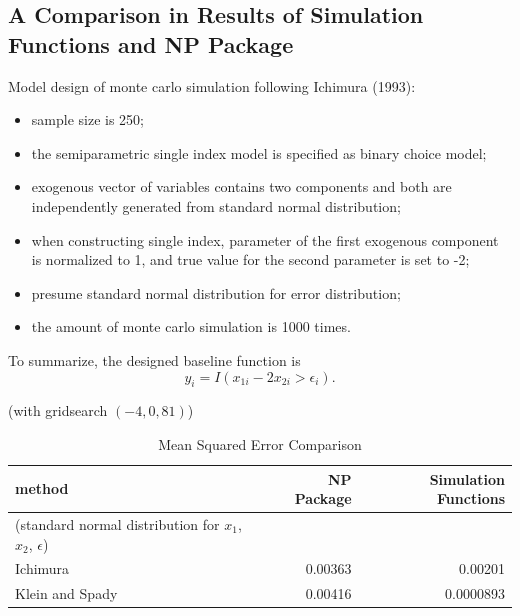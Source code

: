 \documentclass[a4paper]{article}
\begin{document}
\subsection{A Comparison in Results of Simulation Functions and NP Package}
Model design of monte carlo simulation following Ichimura (1993):
\begin{itemize}
\item sample size is 250;
\item the semiparametric single index model is specified as binary choice model;
\item exogenous vector of variables contains two components and both are independently generated from standard normal distribution;
\item when constructing single index, parameter of the first exogenous component is normalized to 1, and true value for the second parameter is set to -2;
\item presume standard normal distribution for error distribution;
\item the amount of monte carlo simulation is 1000 times.
\end{itemize}
To summarize, the designed baseline function is
\begin{equation*}
y_i = I(x_{1i} - 2x_{2i} > \epsilon_i).
\end{equation*}

\begin{table}[H]
\caption {Mean Squared Error Comparison} \label{tab:mean squared error}

(with gridsearch $(-4, 0, 81)$)

\begin{tabular}{l r r}

\toprule
\textbf{method} & \textbf{NP Package} & \textbf{Simulation Functions} \tabularnewline\midrule
(standard normal distribution for $x_1$, $x_2$, $\epsilon$) & &
\tabularnewline
Ichimura & 0.00363 & 0.00201 \tabularnewline
Klein and Spady & 0.00416 & 0.0000893 \tabularnewline

\bottomrule
\end{tabular}
\end{table}
\end{document}
